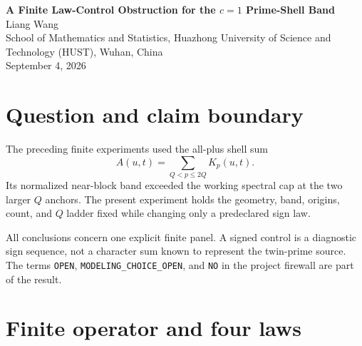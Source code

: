 \documentclass[10pt]{article}
\begin{document}
\small
\begin{center}
{\Large\bf A Finite Law-Control Obstruction for the $c=1$ Prime-Shell Band}\\[5pt]
Liang Wang\\
School of Mathematics and Statistics, Huazhong University of Science and
Technology (HUST), Wuhan, China\\
September 4, 2026
\end{center}

\begin{abstract}
TPC-378 transferred a finite $c=1$ band-support profile to three fresh
coordinate-disjoint origins. This paper tests whether the profile is a
property of the common mask and square-energy geometry, or of the all-plus
prime-shell law. We compare four predeclared laws on a new affine-grid
panel. The complete panel has 36 rows with $N=1024$ and
$Q=512,2048,8192$. The all-plus law has profile $(0,3,3)$, while every
signed control has profile $(0,0,0)$; there are 6 spectral-cap failures and
no Schur-cap failures. This is a finite sign-law-dependence obstruction,
not an arithmetic or twin-prime theorem.
\end{abstract}

\section{Question and claim boundary}

The preceding finite experiments used the all-plus shell sum
\[
 A(u,t)=\sum_{Q<p\leq 2Q}K_p(u,t).
\]
Its normalized near-block band exceeded the working spectral cap at the two
larger $Q$ anchors. The present experiment holds the geometry, band, origins,
count, and $Q$ ladder fixed while changing only a predeclared sign law.

All conclusions concern one explicit finite panel. A signed control is a
diagnostic sign sequence, not a character sum known to represent the
twin-prime source. The terms \texttt{OPEN}, \texttt{MODELING\_CHOICE\_OPEN},
and \texttt{NO} in the project firewall are part of the result.

\section{Finite operator and four laws}
\end{document}
